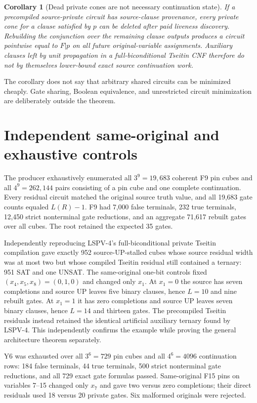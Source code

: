 \documentclass[11pt]{article}
\newtheorem{corollary}{Corollary}
\begin{document}
\begin{corollary}[Dead private cones are not necessary continuation state]
If a precompiled source-private circuit has source-clause provenance, every private cone for a clause satisfied by $p$ can be deleted after paid liveness discovery. Rebuilding the conjunction over the remaining clause outputs produces a circuit pointwise equal to $F|p$ on all future original-variable assignments. Auxiliary clauses left by unit propagation in a full-biconditional Tseitin CNF therefore do not by themselves lower-bound exact source continuation work.
\end{corollary}
The corollary does not say that arbitrary shared circuits can be minimized cheaply. Gate sharing, Boolean equivalence, and unrestricted circuit minimization are deliberately outside the theorem.

\section{Independent same-original and exhaustive controls}
The producer exhaustively enumerated all $3^9=19{,}683$ coherent F9 pin cubes and all $4^9=262{,}144$ pairs consisting of a pin cube and one complete continuation. Every residual circuit matched the original source truth value, and all 19,683 gate counts equaled $L(R)-1$. F9 had 7,000 false terminals, 232 true terminals, 12,450 strict nonterminal gate reductions, and an aggregate 71,617 rebuilt gates over all cubes. The root retained the expected 35 gates.

Independently reproducing LSPV-4's full-biconditional private Tseitin compilation gave exactly 952 source-UP-stalled cubes whose source residual width was at most two but whose compiled Tseitin residual still contained a ternary: 951 SAT and one UNSAT. The same-original one-bit controls fixed $(x_4,x_5,x_8)=(0,1,0)$ and changed only $x_1$. At $x_1=0$ the source has seven completions and source UP leaves five binary clauses, hence $L=10$ and nine rebuilt gates. At $x_1=1$ it has zero completions and source UP leaves seven binary clauses, hence $L=14$ and thirteen gates. The precompiled Tseitin residuals instead retained the identical artificial auxiliary ternary found by LSPV-4. This independently confirms the example while proving the general architecture theorem separately.

Y6 was exhausted over all $3^6=729$ pin cubes and all $4^6=4096$ continuation rows: 184 false terminals, 44 true terminals, 500 strict nonterminal gate reductions, and all 729 exact gate formulas passed. Same-original F15 pins on variables 7--15 changed only $x_7$ and gave two versus zero completions; their direct residuals used 18 versus 20 private gates. Six malformed originals were rejected.
\end{document}

